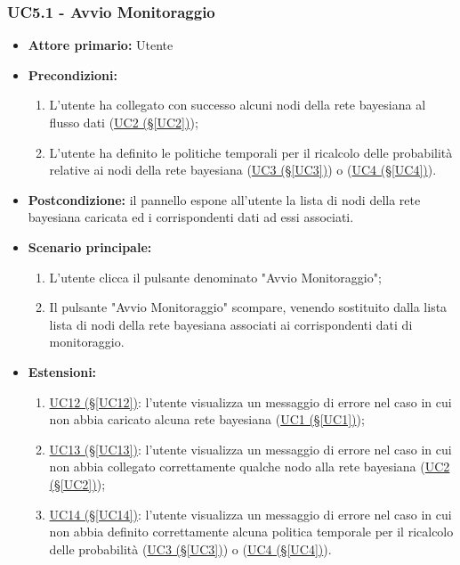 \subsubsection{UC5.1 - Avvio Monitoraggio}\label{UC5.1}
\begin{itemize}
\item \textbf{Attore primario:} Utente
\item \textbf{Precondizioni:}
	\begin{enumerate}
	\item L'utente ha collegato con successo alcuni nodi della rete bayesiana al flusso dati (\hyperref[UC2]{UC2 					(§\ref*{UC2})});
	\item L'utente ha definito le politiche temporali per il ricalcolo delle probabilità relative ai nodi della rete bayesiana (\hyperref[UC3]{UC3 (§\ref*{UC3})}) o (\hyperref[UC4]{UC4 (§\ref*{UC4})}).
	\end{enumerate}
\item \textbf{Postcondizione:} il pannello espone all'utente la lista di nodi della rete bayesiana caricata ed i corrispondenti dati ad essi associati.
\item \textbf{Scenario principale:}
	\begin{enumerate}
	\item L'utente clicca il pulsante denominato "Avvio Monitoraggio";
	\item Il pulsante "Avvio Monitoraggio" scompare, venendo sostituito dalla lista lista di nodi della rete 	bayesiana associati ai corrispondenti dati di monitoraggio.
	\end{enumerate}
\item \textbf{Estensioni:}
	\begin{enumerate}
	\item \hyperref[UC12]{UC12 (§\ref*{UC12})}: l'utente visualizza un messaggio di errore nel caso in cui non abbia caricato alcuna rete bayesiana (\hyperref[UC1]{UC1 (§\ref*{UC1})});
	\item \hyperref[UC13]{UC13 (§\ref*{UC13})}: l'utente visualizza un messaggio di errore nel caso in cui non abbia collegato correttamente qualche nodo alla rete bayesiana (\hyperref[UC2]{UC2 (§\ref*{UC2})});
	\item \hyperref[UC14]{UC14 (§\ref*{UC14})}: l'utente visualizza un messaggio di errore nel caso in cui non abbia definito correttamente alcuna politica temporale per il ricalcolo delle probabilità (\hyperref[UC3]{UC3 (§\ref*{UC3})}) o (\hyperref[UC4]{UC4 (§\ref*{UC4})}).
	\end{enumerate}
\end{itemize}

